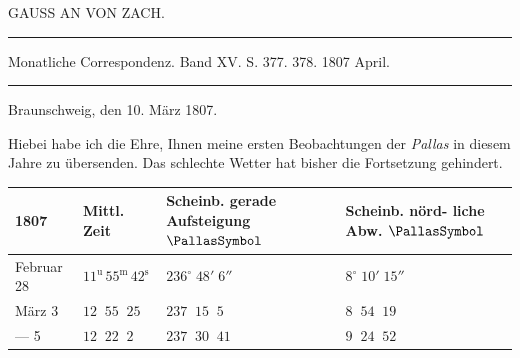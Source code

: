 \par\bigskip
{}
\hypertarget{native-286-lower}{}
\begin{center}
\large GAUSS AN VON ZACH.
\end{center}

\begin{center}
\parbox{.76\linewidth}{%
\centering\fontsize{8.2}{10.2}\selectfont
\hrule height .3pt\relax\vspace{2.5pt}
Monatliche Correspondenz. Band XV. S. 377. 378. 1807 April.\par
\vspace{2.5pt}\hrule height .3pt\relax
}
\end{center}

\begin{flushright}
Braunschweig, den 10. März 1807.
\end{flushright}

\par\indent Hiebei habe ich die Ehre, Ihnen meine ersten Beobachtungen der \emph{Pallas} in diesem Jahre zu
übersenden. Das schlechte Wetter hat bisher die Fortsetzung gehindert.

\begin{center}\begingroup
\fontsize{9}{11}\selectfont
\setlength{\tabcolsep}{3pt}\renewcommand{\arraystretch}{1.15}
\begin{tabular}{l|l|l|l}
1807 & Mittl. Zeit & \shortstack{Scheinb. gerade\\Aufsteigung $\PallasSymbol$} & \shortstack{Scheinb. nörd-\\liche Abw. $\PallasSymbol$} \\
\hline
Februar 28 & $11^{\mathrm u}\,55^{\mathrm m}\,42^{\mathrm s}$ & $236^\circ\;48'\;6''$ & $8^\circ\;10'\;15''$ \\
März \phantom{0}3 & $12\;\;55\;\;25$ & $237\;\;15\;\;5$ & $8\;\;54\;\;19$ \\
--- \phantom{0}5 & $12\;\;22\;\;2$ & $237\;\;30\;\;41$ & $9\;\;24\;\;52$ \\
\end{tabular}\endgroup\end{center}

